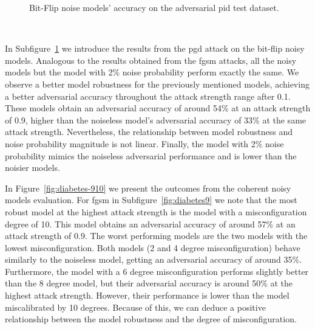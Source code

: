 \begin{figure}[!h]
\begin{subfigure}{0.45\textwidth}
      \label{fig:diabetes8}
  \end{subfigure}
  \caption{Bit-Flip noise models' accuracy on the adversarial \ac{pid} test dataset.}
  \label{fig:diabetes-78}
\end{figure} \

In Subfigure~\ref{fig:diabetes8} we introduce the results from the \ac{pgd}
attack on the bit-flip noisy models. Analogous to the results obtained
from the \ac{fgsm} attacks, all the noisy models but the model with 2\%
noise probability perform exactly the same. We observe a better model
robustness for the previously mentioned models, achieving a better
adversarial accuracy throughout the attack strength range after 0.1.
These models obtain an adversarial accuracy of around 54\% at
an attack strength of 0.9, higher than the noiseless model's adversarial
accuracy of 33\% at the same attack strength. Nevertheless, the
relationship between model robustness and noise probability magnitude
is not linear. Finally, the model with 2\% noise probability mimics
the noiseless adversarial performance and is lower than the noisier
models. \

In Figure~\ref{fig:diabetes-910} we present the outcomes from the coherent
noisy models evaluation. For \ac{fgsm} in Subfigure~\ref{fig:diabetes9}
we note that the most robust model at the highest attack strength
is the model with a misconfiguration degree of 10. This model obtains
an adversarial accuracy of around 57\% at an attack strength of 0.9. The
worst performing models are the two models with the lowest misconfiguration.
Both models (2 and 4 degree misconfiguration) behave similarly to the
noiseless model, getting an adversarial accuracy of around 35\%. Furthermore,
the model with a 6 degree misconfiguration performs slightly better than
the 8 degree model, but their adversarial accuracy is around 50\% at the
highest attack strength. However, their performance is lower than the
model miscalibrated by 10 degrees. Because of this, we can deduce a
positive relationship between the model robustness and the degree of
misconfiguration. \


